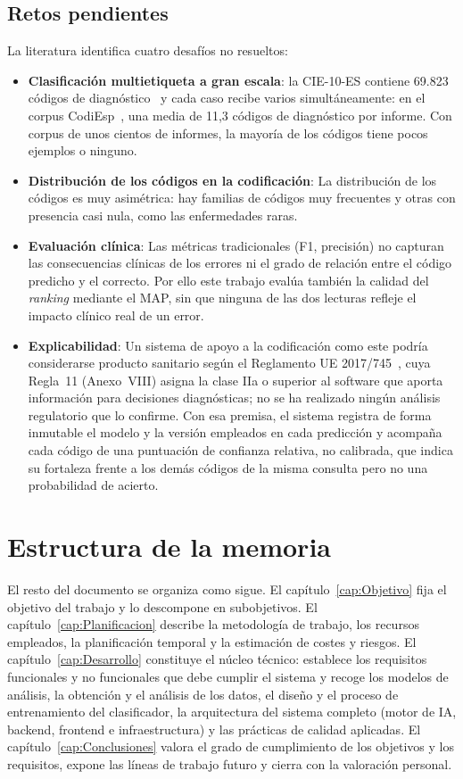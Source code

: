 \subsection{Retos pendientes}
La literatura identifica cuatro desafíos no resueltos:
\begin{itemize}
\item \textbf{Clasificación multietiqueta a gran escala}: la CIE-10-ES contiene 69.823 códigos de diagnóstico~\cite{gogorcena2017cie10es} y cada caso recibe varios simultáneamente: en el corpus CodiEsp~\cite{miranda2020}, una media de 11,3 códigos de diagnóstico por informe. Con corpus de unos cientos de informes, la mayoría de los códigos tiene pocos ejemplos o ninguno.
\item \textbf{Distribución de los códigos en la codificación}: La distribución de los códigos es muy asimétrica: hay familias de códigos muy frecuentes y otras con presencia casi nula, como las enfermedades raras.
\item \textbf{Evaluación clínica}: Las métricas tradicionales (F1, precisión) no capturan las consecuencias clínicas de los errores ni el grado de relación entre el código predicho y el correcto. Por ello este trabajo evalúa también la calidad del \emph{ranking} mediante el MAP, sin que ninguna de las dos lecturas refleje el impacto clínico real de un error.
\item \textbf{Explicabilidad}: Un sistema de apoyo a la codificación como este podría considerarse producto sanitario según el Reglamento UE 2017/745~\cite[Anexo~VIII, regla~11]{eu2017745}, cuya Regla~11 (Anexo~VIII) asigna la clase IIa o superior al software que aporta información para decisiones diagnósticas; no se ha realizado ningún análisis regulatorio que lo confirme. Con esa premisa, el sistema registra de forma inmutable el modelo y la versión empleados en cada predicción y acompaña cada código de una puntuación de confianza relativa, no calibrada, que indica su fortaleza frente a los demás códigos de la misma consulta pero no una probabilidad de acierto.
\end{itemize}

\section{Estructura de la memoria}

El resto del documento se organiza como sigue. El capítulo~\ref{cap:Objetivo} fija el objetivo del trabajo y lo descompone en subobjetivos. El capítulo~\ref{cap:Planificacion} describe la metodología de trabajo, los recursos empleados, la planificación temporal y la estimación de costes y riesgos. El capítulo~\ref{cap:Desarrollo} constituye el núcleo técnico: establece los requisitos funcionales y no funcionales que debe cumplir el sistema y recoge los modelos de análisis, la obtención y el análisis de los datos, el diseño y el proceso de entrenamiento del clasificador, la arquitectura del sistema completo (motor de IA, backend, frontend e infraestructura) y las prácticas de calidad aplicadas. El capítulo~\ref{cap:Conclusiones} valora el grado de cumplimiento de los objetivos y los requisitos, expone las líneas de trabajo futuro y cierra con la valoración personal.

